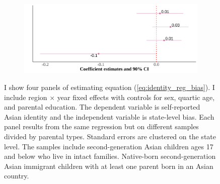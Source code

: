 \begin{center}
\begin{figure}[!htb]
\begin{subfigure}{.48\textwidth}
\centering
\includegraphics[width=.9\linewidth]{by-parents-regs-wh.png}
\end{subfigure}
\caption*{\footnotesize{I show four panels of estimating equation (\ref{eq:identity_reg_bias}). I include region $\times$ year fixed effects with controls for sex, quartic age, and parental education. The dependent variable is self-reported Asian identity and the independent variable is state-level bias. Each panel results from the same regression but on different samples divided by parental types. Standard errors are clustered on the state level. The samples include second-generation Asian children ages 17 and below who live in intact families. Native-born second-generation Asian immigrant children with at least one parent born in an Asian country.}}
\end{figure}
\end{center}

\pagebreak
\newpage



\pagebreak
\newpage



\pagebreak
\newpage



\pagebreak
\newpage


\pagebreak
\newpage


% 

\clearpage
